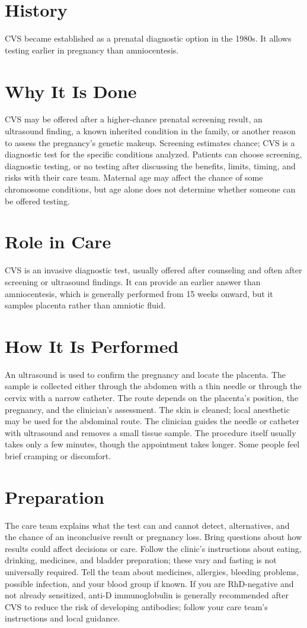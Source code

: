 \section*{History}
CVS became established as a prenatal diagnostic option in the 1980s. It allows testing earlier in pregnancy than amniocentesis.

\section*{Why It Is Done}
CVS may be offered after a higher-chance prenatal screening result, an ultrasound finding, a known inherited condition in the family, or another reason to assess the pregnancy's genetic makeup. Screening estimates chance; CVS is a diagnostic test for the specific conditions analyzed. Patients can choose screening, diagnostic testing, or no testing after discussing the benefits, limits, timing, and risks with their care team. Maternal age may affect the chance of some chromosome conditions, but age alone does not determine whether someone can be offered testing.

\section*{Role in Care}
CVS is an invasive diagnostic test, usually offered after counseling and often after screening or ultrasound findings. It can provide an earlier answer than amniocentesis, which is generally performed from 15 weeks onward, but it samples placenta rather than amniotic fluid.

\section*{How It Is Performed}
An ultrasound is used to confirm the pregnancy and locate the placenta. The sample is collected either through the abdomen with a thin needle or through the cervix with a narrow catheter. The route depends on the placenta's position, the pregnancy, and the clinician's assessment. The skin is cleaned; local anesthetic may be used for the abdominal route. The clinician guides the needle or catheter with ultrasound and removes a small tissue sample. The procedure itself usually takes only a few minutes, though the appointment takes longer. Some people feel brief cramping or discomfort.

\section*{Preparation}
The care team explains what the test can and cannot detect, alternatives, and the chance of an inconclusive result or pregnancy loss. Bring questions about how results could affect decisions or care. Follow the clinic's instructions about eating, drinking, medicines, and bladder preparation; these vary and fasting is not universally required. Tell the team about medicines, allergies, bleeding problems, possible infection, and your blood group if known. If you are RhD-negative and not already sensitized, anti-D immunoglobulin is generally recommended after CVS to reduce the risk of developing antibodies; follow your care team's instructions and local guidance.

